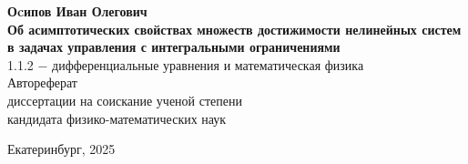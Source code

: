 \documentclass[../main.tex]{subfiles}
\begin{document}
\begin{titlepage}
 \begin{center}
 \vspace*{3cm}
 {\textbf{Оcипов Иван Олегович}}\\
 \vspace*{1cm}
 {\textbf{Об асимптотических свойствах множеств достижимости нелинейных систем в задачах управления с интегральными ограничениями}}\\
 \vspace*{2cm}
 {1.1.2 $-$ дифференциальные уравнения и математическая физика}\\
 \vspace*{1cm}
 {Автореферат \\ диссертации на соискание ученой степени \\
 кандидата физико-математических наук}\\
 \end{center}
 
 \vspace*{\fill}
 \begin{center}
 {Екатеринбург, 2025}
 \end{center}
\end{titlepage}
\end{document}
